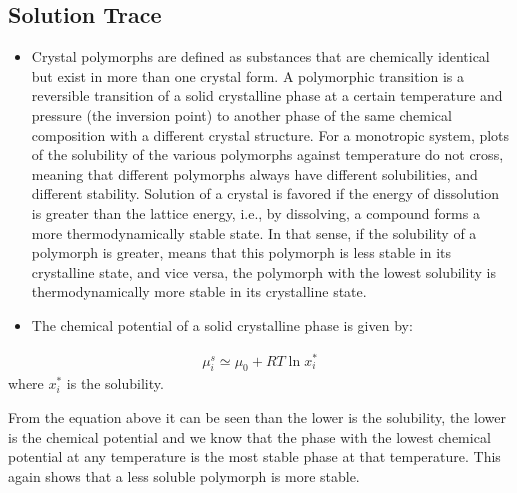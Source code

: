 \documentclass[letterpaper,10pt,english]{jupyterBook}
\begin{document}
\subsection{Solution Trace}
\label{\detokenize{Exercise_W8_2021:solution-trace}}
\sphinxAtStartPar
{}
\begin{itemize}
\item {} 
\sphinxAtStartPar
Crystal polymorphs are defined as substances that are chemically identical but exist in more than one crystal form. A polymorphic transition is a reversible transition of a solid crystalline phase at a certain temperature and pressure (the inversion point) to another phase of the same chemical composition with a different crystal structure.
For a monotropic system, plots of the solubility of the various polymorphs against temperature do not cross, meaning that different polymorphs always have different solubilities, and different stability.
Solution of a crystal is favored if the energy of dissolution is greater than the lattice energy, i.e., by dissolving, a compound forms a more thermodynamically stable state. In that sense, if the solubility of a polymorph is greater, means that this polymorph is less stable in its
crystalline state, and vice versa, the polymorph with the lowest solubility is thermodynamically more stable in its crystalline state.

\item {} 
\sphinxAtStartPar
The chemical potential of a solid crystalline phase is given by:

\end{itemize}
\begin{equation*}
\begin{split}
\mu_{i}^s\simeq\mu_0+RT\ln{x_i^*}
\end{split}
\end{equation*}
\sphinxAtStartPar
where \(x_i^*\) is the solubility.

\sphinxAtStartPar
From the equation above it can be seen than the lower is the solubility, the lower is the chemical potential and we know that the phase with the lowest chemical potential at any temperature is the most stable phase at that temperature. This again shows that a less soluble polymorph is more stable.
\end{document}
